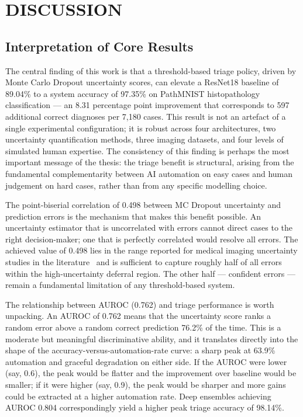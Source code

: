 
\chapter{DISCUSSION}

\section{Interpretation of Core Results}

The central finding of this work is that a threshold-based triage policy, driven by Monte Carlo Dropout uncertainty scores, can elevate a ResNet18 baseline of 89.04\% to a system accuracy of 97.35\% on PathMNIST histopathology classification --- an 8.31 percentage point improvement that corresponds to 597 additional correct diagnoses per 7,180 cases. This result is not an artefact of a single experimental configuration; it is robust across four architectures, two uncertainty quantification methods, three imaging datasets, and four levels of simulated human expertise. The consistency of this finding is perhaps the most important message of the thesis: the triage benefit is structural, arising from the fundamental complementarity between AI automation on easy cases and human judgement on hard cases, rather than from any specific modelling choice.

The point-biserial correlation of 0.498 between MC Dropout uncertainty and prediction errors is the mechanism that makes this benefit possible. An uncertainty estimator that is uncorrelated with errors cannot direct cases to the right decision-maker; one that is perfectly correlated would resolve all errors. The achieved value of 0.498 lies in the range reported for medical imaging uncertainty studies in the literature~\cite{leibig2017leveraging} and is sufficient to capture roughly half of all errors within the high-uncertainty deferral region. The other half --- confident errors --- remain a fundamental limitation of any threshold-based system.

The relationship between AUROC (0.762) and triage performance is worth unpacking. An AUROC of 0.762 means that the uncertainty score ranks a random error above a random correct prediction 76.2\% of the time. This is a moderate but meaningful discriminative ability, and it translates directly into the shape of the accuracy-versus-automation-rate curve: a sharp peak at 63.9\% automation and graceful degradation on either side. If the AUROC were lower (say, 0.6), the peak would be flatter and the improvement over baseline would be smaller; if it were higher (say, 0.9), the peak would be sharper and more gains could be extracted at a higher automation rate. Deep ensembles achieving AUROC 0.804 correspondingly yield a higher peak triage accuracy of 98.14\%.

